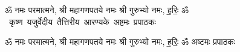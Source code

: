 \documentclass[17pt]{extarticle}
\begin{document}
\begin{titlepage}
    \begin{center}
 
\begin{sanskrit}
    { \Large
    ॐ नमः परमात्मने, श्री महागणपतये नमः
श्री गुरुभ्यो नमः, ह॒रिः॒ ॐ 
    }
    \\
    \vspace{2.5cm}
    \mbox{ \Huge
    कृष्ण यजुर्वेदीय तैत्तिरीय आरण्यके अष्टमः प्रपाठकः   }
\end{sanskrit}
\end{center}

\end{titlepage}
\tableofcontents

ॐ नमः परमात्मने, श्री महागणपतये नमः
श्री गुरुभ्यो नमः, ह॒रिः॒ ॐ      अष्टमः प्रपाठकः \newline

\end{document}
